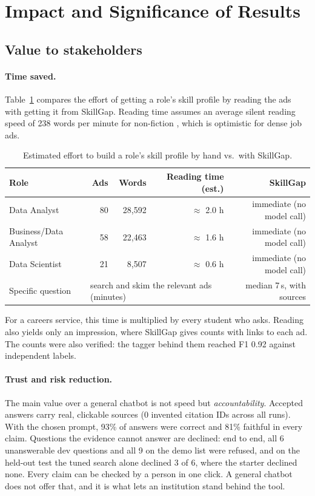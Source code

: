 \section{Impact and Significance of Results}\label{sec:impact}

\subsection{Value to stakeholders}

\paragraph{Time saved.} Table~\ref{tab:time} compares the effort of getting a role's skill profile by reading the ads with getting it from SkillGap. Reading time assumes an average silent reading speed of 238 words per minute for non-fiction \citep{brysbaert2019reading}, which is optimistic for dense job ads.

\begin{table}[H]
\caption{Estimated effort to build a role's skill profile by hand vs.\ with SkillGap.}\label{tab:time}
\small
\begin{tabular}{lrrrr}
\toprule
Role & Ads & Words & Reading time (est.) & SkillGap \\
\midrule
Data Analyst & 80 & 28,592 & $\approx$ 2.0 h & immediate (no model call) \\
Business/Data Analyst & 58 & 22,463 & $\approx$ 1.6 h & immediate (no model call) \\
Data Scientist & 21 & 8,507 & $\approx$ 0.6 h & immediate (no model call) \\
\midrule
Specific question & \multicolumn{3}{l}{search and skim the relevant ads (minutes)} & median 7\,s, with sources \\
\bottomrule
\end{tabular}
\end{table}

For a careers service, this time is multiplied by every student who asks. Reading also yields only an impression, where SkillGap gives counts with links to each ad. The counts were also verified: the tagger behind them reached F1 0.92 against independent labels.

\paragraph{Trust and risk reduction.} The main value over a general chatbot is not speed but \emph{accountability}. Accepted answers carry real, clickable sources (0 invented citation IDs across all runs). With the chosen prompt, 93\% of answers were correct and 81\% faithful in every claim. Questions the evidence cannot answer are declined: end to end, all 6 unanswerable dev questions and all 9 on the demo list were refused, and on the held-out test the tuned search alone declined 3 of 6, where the starter declined none. Every claim can be checked by a person in one click. A general chatbot does not offer that, and it is what lets an institution stand behind the tool.

